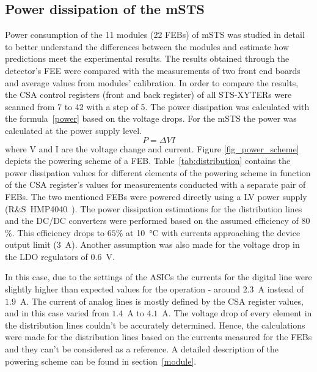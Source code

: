 \subsection{Power dissipation of the mSTS}
 Power consumption of the 11 modules (22 \glspl{FEB}) of \gls{mSTS} was studied in detail to better understand the differences between the modules and estimate how predictions meet the experimental results. The results obtained through the detector's \gls{FEE} were compared with the measurements of two front end boards and average values from modules' calibration. In order to compare the results, the \gls{CSA} control registers (front and back register) of all STS-XYTERs were scanned from 7 to 42 with a step of 5. The power dissipation was calculated with the formula~\ref{power} based on the voltage drops. For the \gls{mSTS} the power was calculated at the power supply level.
  \begin{equation}
  \label{power}
    P = \Delta VI
\end{equation}
where V and I are the voltage change and current. Figure \ref{fig_power_scheme} depicts the powering scheme of a \gls{FEB}. Table~\ref{tab:distribution} contains the power dissipation values for different elements of the powering scheme in function of the \gls{CSA} register's values for measurements conducted with a separate pair of \glspl{FEB}. The two mentioned \glspl{FEB} were powered directly using a \gls{LV} power supply (R\&S~HMP4040~\cite{RS}). The power dissipation estimations for the distribution lines and the DC/DC converters were performed based on the assumed efficiency of $80$\%. This efficiency drops to $65$\% at \SI{10}{\celsius} with currents approaching the device output limit ($3$~A).  Another assumption was also made for the voltage drop in the \gls{LDO} regulators of $0.6$~V.
 
 In this case, due to the settings of the \glspl{ASIC} the currents for the digital line were slightly higher than expected values for the operation - around $2.3$~A instead of $1.9$~A. The current of analog lines is mostly defined by the \gls{CSA} register values, and in this case varied from $1.4$~A to $4.1$~A.  The voltage drop of every element in the distribution lines couldn't be accurately determined. Hence, the calculations were made for the distribution lines based on the currents measured for the \glspl{FEB} and they can't be considered as a reference. A detailed description of the powering scheme can be found in section~\ref{module}.


